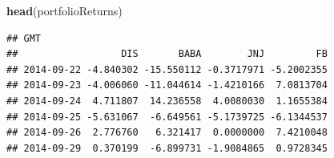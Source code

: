 \documentclass[]{article}
\newenvironment{Shaded}{\begin{snugshade}}{\end{snugshade}}
\newcommand{\KeywordTok}[1]{\textcolor[rgb]{0.13,0.29,0.53}{\textbf{#1}}}
\newcommand{\NormalTok}[1]{#1}
\begin{document}
\begin{Shaded}
\begin{Highlighting}[]
\KeywordTok{head}\NormalTok{(portfolioReturns)}
\end{Highlighting}
\end{Shaded}

\begin{verbatim}
## GMT
##                  DIS       BABA        JNJ         FB
## 2014-09-22 -4.840302 -15.550112 -0.3717971 -5.2002355
## 2014-09-23 -4.006060 -11.044614 -1.4210166  7.0813704
## 2014-09-24  4.711807  14.236558  4.0080030  1.1655384
## 2014-09-25 -5.631067  -6.649561 -5.1739725 -6.1344537
## 2014-09-26  2.776760   6.321417  0.0000000  7.4210048
## 2014-09-29  0.370199  -6.899731 -1.9084865  0.9728345
\end{verbatim}
\end{document}
